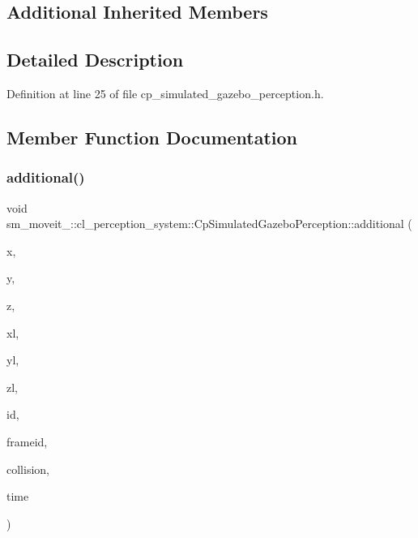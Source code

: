 \subsection*{Additional Inherited Members}


\subsection{Detailed Description}


Definition at line 25 of file cp\+\_\+simulated\+\_\+gazebo\+\_\+perception.\+h.



\subsection{Member Function Documentation}
\mbox{\label{classsm__moveit__4_1_1cl__perception__system_1_1CpSimulatedGazeboPerception_a23c97387cc84b87183a39489438aeaf0}} 
\subsubsection{\texorpdfstring{additional()}{additional()}}
{\footnotesize\ttfamily void sm\+\_\+moveit\+\_\+::cl\+\_\+perception\+\_\+system\+::\+Cp\+Simulated\+Gazebo\+Perception\+::additional (\begin{DoxyParamCaption}\item[{float}]{x,  }\item[{float}]{y,  }\item[{float}]{z,  }\item[{float}]{xl,  }\item[{float}]{yl,  }\item[{float}]{zl,  }\item[{std\+::string}]{id,  }\item[{std\+::string}]{frameid,  }\item[{moveit\+\_\+msgs\+::\+Collision\+Object \&}]{collision,  }\item[{ros\+::\+Time}]{time }\end{DoxyParamCaption})\hspace{0.3cm}{\ttfamily [inline]}}



